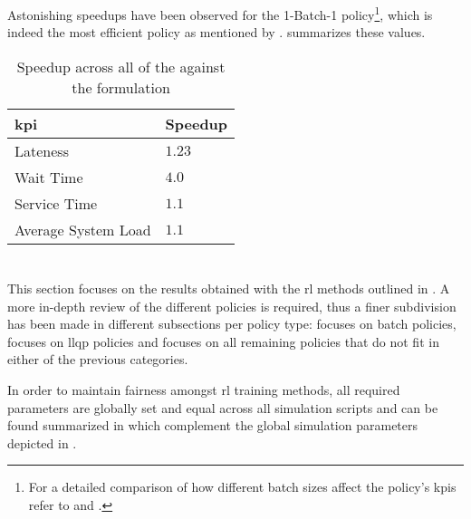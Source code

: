
Astonishing speedups have been observed for the 1-Batch-1 policy\footnote{For a detailed comparison of how different batch sizes affect the policy's \glspl{kpi} refer to  and .}, which is indeed the most efficient policy as mentioned by \citet[p. 24]{Zeng2005}.  summarizes these values.

\begin{table}[!ht]
	\centering
		\begin{tabular}{@{}ll@{}}
		\toprule
		\gls{kpi}                 & Speedup \\ \midrule
		Lateness            & $1.23$             \\
		Wait Time           & $4.0$             \\
		Service Time        & $1.1$             \\
		Average System Load & $1.1$             \\ \bottomrule
		\end{tabular}
	\caption{Speedup across all  of the  against the  formulation}
	\label{tab:opt_kpis_comp_gain}
\end{table}

\section{}
\label{sec:rl_results}

This section focuses on the results obtained with the \gls{rl} methods outlined in . A more in-depth review of the different policies is required, thus a finer subdivision has been made in different subsections per policy type:  focuses on batch policies,  focuses on \gls{llqp} policies and  focuses on all remaining policies that do not fit in either of the previous categories.

In order to maintain fairness amongst \gls{rl} training methods, all required parameters are globally set and equal across all simulation scripts and can be found summarized in  which complement the global simulation parameters depicted in .

